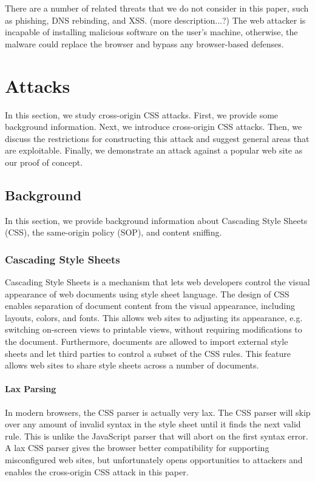 \documentclass{acm_proc_article-sp}
\begin{document}
There are a number of related threats that we do not consider in this paper, such as phishing, DNS rebinding, and XSS.
(more description...?)
The web attacker is incapable of installing malicious software on the user's machine, otherwise, the malware could replace the browser and bypass any browser-based defenses.

\section{Attacks}
In this section, we study cross-origin CSS attacks. First, we provide some background information. Next, we introduce cross-origin CSS attacks. Then, we discuss the restrictions for constructing this attack and suggest general areas that are exploitable. Finally, we demonstrate an attack against a popular web site as our proof of concept.

\subsection{Background}
In this section, we provide background information about Cascading Style Sheets (CSS), the same-origin policy (SOP), and content sniffing.

\subsubsection{Cascading Style Sheets}
Cascading Style Sheets\cite{css} is a mechanism that lets web developers control the visual appearance of web documents using style sheet language. The design of CSS enables separation of document content from the visual appearance, including layouts, colors, and fonts. This allows web sites to adjusting its appearance, e.g. switching on-screen views to printable views, without requiring modifications to the document. Furthermore, documents are allowed to import external style sheets and let third parties to control a subset of the CSS rules. This feature allows web sites to share style sheets across a number of documents.

\paragraph{Lax Parsing}
In modern browsers, the CSS parser is actually very lax. The CSS parser will skip over any amount of invalid syntax in the style sheet until it finds the next valid rule. This is unlike the JavaScript parser that will abort on the first syntax error. A lax CSS parser gives the browser better compatibility for supporting misconfigured web sites, but unfortunately opens opportunities to attackers and enables the cross-origin CSS attack in this paper.
\end{document}
